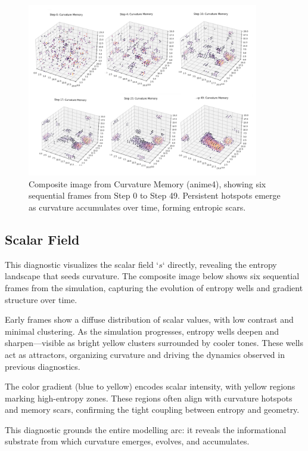 \documentclass[12pt]{article}
\begin{document}
\begin{figure}[h]
    \centering
    \includegraphics[width=0.9\textwidth]{Figures/Figure_9.PNG}
    \caption{Composite image from Curvature Memory (anime4), showing six sequential frames from Step 0 to Step 49. Persistent hotspots emerge as curvature accumulates over time, forming entropic scars.}
    \label{fig:curvature_memory}
\end{figure}

\subsection{Scalar Field}

This diagnostic visualizes the scalar field `\( s \)` directly, revealing the entropy landscape that seeds curvature. The composite image below shows six sequential frames from the simulation, capturing the evolution of entropy wells and gradient structure over time.

Early frames show a diffuse distribution of scalar values, with low contrast and minimal clustering. As the simulation progresses, entropy wells deepen and sharpen—visible as bright yellow clusters surrounded by cooler tones. These wells act as attractors, organizing curvature and driving the dynamics observed in previous diagnostics.

The color gradient (blue to yellow) encodes scalar intensity, with yellow regions marking high-entropy zones. These regions often align with curvature hotspots and memory scars, confirming the tight coupling between entropy and geometry.

This diagnostic grounds the entire modelling arc: it reveals the informational substrate from which curvature emerges, evolves, and accumulates.
\end{document}
